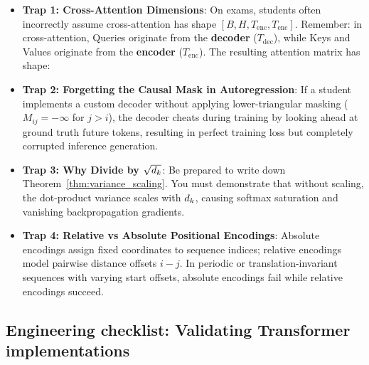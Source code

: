 \documentclass[../labs.tex]{subfiles}
\begin{document}
\begin{examinsight}
\begin{itemize}
    \item \textbf{Trap 1: Cross-Attention Dimensions}: On exams, students often incorrectly assume cross-attention has shape $[B, H, T_{\text{enc}}, T_{\text{enc}}]$. Remember: in cross-attention, Queries originate from the \textbf{decoder} ($T_{\text{dec}}$), while Keys and Values originate from the \textbf{encoder} ($T_{\text{enc}}$). The resulting attention matrix has shape:
    \begin{equation}
        [B, H, T_{\text{dec}}, T_{\text{enc}}]
    \end{equation}
    \item \textbf{Trap 2: Forgetting the Causal Mask in Autoregression}: If a student implements a custom decoder without applying lower-triangular masking ($M_{ij} = -\infty$ for $j > i$), the decoder cheats during training by looking ahead at ground truth future tokens, resulting in perfect training loss but completely corrupted inference generation.
    \item \textbf{Trap 3: Why Divide by $\sqrt{d_k}$}: Be prepared to write down Theorem~\ref{thm:variance_scaling}. You must demonstrate that without scaling, the dot-product variance scales with $d_k$, causing softmax saturation and vanishing backpropagation gradients.
    \item \textbf{Trap 4: Relative vs Absolute Positional Encodings}: Absolute encodings assign fixed coordinates to sequence indices; relative encodings model pairwise distance offsets $i - j$. In periodic or translation-invariant sequences with varying start offsets, absolute encodings fail while relative encodings succeed.
\end{itemize}
\end{examinsight}

\subsection{Engineering checklist: Validating Transformer implementations}
\end{document}

